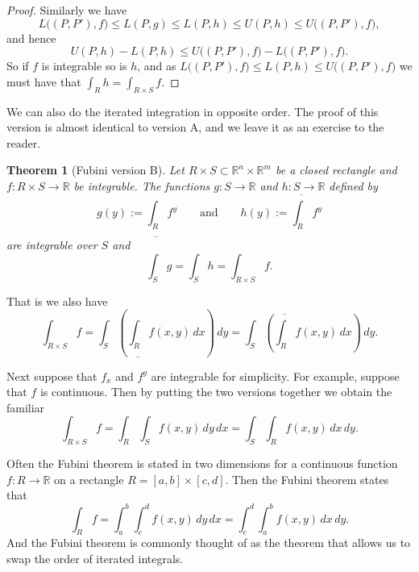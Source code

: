 \documentclass[12pt]{book}
\newcommand{\R}{{\mathbb{R}}}
\theoremstyle{plain}
\newtheorem{thm}{Theorem}[section]
\theoremstyle{remark}
\theoremstyle{definition}
\theoremstyle{exercise}
\theoremstyle{example}
\begin{document}
\begin{proof}
Similarly we have
\begin{equation*}
L\bigl((P,P'),f\bigr)
\leq
L(P,g) \leq
L(P,h) \leq
U(P,h) \leq
U\bigl((P,P'),f\bigr) ,
\end{equation*}
and hence
\begin{equation*}
U(P,h) - L(P,h)
\leq
U\bigl((P,P'),f\bigr) -
L\bigl((P,P'),f\bigr) .
\end{equation*}
So if $f$ is integrable so is $h$, and
as $L\bigl((P,P'),f\bigr) \leq L(P,h) \leq U\bigl((P,P'),f\bigr)$ we must have
that $\int_R h = \int_{R \times S} f$.
\end{proof}

We can also do the iterated integration in opposite order.
The proof of this version is almost identical to version A, and
we leave it as an exercise to the reader.

\begin{thm}[Fubini version B]\label{mv:fubinivB}
Let $R \times S \subset \R^n \times \R^m$ be a closed rectangle and
$f \colon R \times S \to \R$ be integrable.
The functions $g \colon S \to \R$ and $h \colon S \to \R$ defined by
\begin{equation*}
g(y) := \underline{\int_R} f^y \qquad
\text{and} \qquad
h(y) := \overline{\int_R} f^y 
\end{equation*}
are integrable over $S$ and
\begin{equation*}
\int_S g = \int_S h = \int_{R \times S} f .
\end{equation*}
\end{thm}

That is we also have
\begin{equation*}
\int_{R \times S} f
=
 \int_S \left(
 \underline{\int_R} f(x,y) \, dx
\right) \, dy
=
 \int_S \left(
 \overline{\int_R} f(x,y) \, dx
\right) \, dy .
\end{equation*}

Next suppose that $f_x$ and $f^y$ are integrable for simplicity.
For example, suppose that $f$ is continuous.  Then by
putting the two versions together we obtain the familiar
\begin{equation*}
\int_{R \times S} f
=
 \int_R 
 \int_S f(x,y) \, dy \, dx 
=
 \int_S 
 \int_R f(x,y) \, dx \, dy .
\end{equation*}

Often the Fubini theorem is stated in two dimensions
for a continuous function $f \colon R \to
\R$ on a rectangle $R = [a,b] \times [c,d]$.  Then the Fubini theorem
states that
\begin{equation*}
\int_R f = \int_a^b \int_c^d f(x,y) \,dy\,dx
=
\int_c^d \int_a^b f(x,y) \,dx\,dy .
\end{equation*}
And the Fubini theorem is commonly thought of as the theorem that allows us
to swap the order of iterated integrals.
\end{document}
